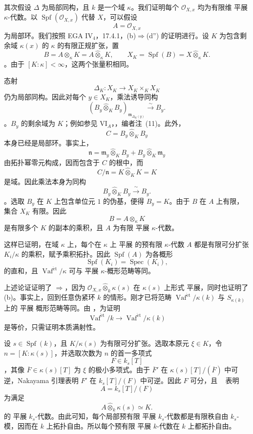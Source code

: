 其次假设 \(\Delta\) 为局部同构，且 \(k\) 是一个域 \(\kappa\)。我们证明每个 \(\mathcal O_{X,x}\) 均为有限维 平展 \(\kappa\)-代数。以 \(\operatorname{Spf}(\mathcal O_{X,x})\) 代替 \(X\)，可以假设 \[
  A=\mathcal O_{X,x}
\] 为局部环。我们按照 EGA \(\mathrm{IV}_4\)，17.4.1，\textup{(b)}\(\Rightarrow\)\textup{(d'')} 的证明进行。设 \(K\) 为包含剩余域 \(\kappa(x)\) 的 \(\kappa\) 的有限正规扩张，置 \[
  B=A\otimes_\kappa K
   =A\widehat\otimes_\kappa K,
  \qquad
  X_K=\operatorname{Spf}(B)
      =X\widehat\otimes_\kappa K.
\]。由于 \([K:\kappa]<\infty\)，这两个张量积相同。

态射 \[
  \Delta_K:
  X_K\longrightarrow X_K\times_KX_K
\] 仍为局部同构。因此对每个 \(y\in X_K\)，乘法诱导同构 \[
  \left(
    B_y\widehat\otimes_KB_y
  \right)_{\mathfrak m_{\Delta_K(y)}}
  \xrightarrow{\ \sim\ }
  B_y.
\]。\(B_y\) 的剩余域为 \(K\)；例如参见 \(\mathrm{VI}_A\)，，编者注~(11)。此外，\[
  C=B_y\widehat\otimes_KB_y
\] 本身已经是局部环。事实上，\[
  \mathfrak n
  =
  \mathfrak m_y\widehat\otimes_KB_y
  +
  B_y\widehat\otimes_K\mathfrak m_y
\] 由拓扑幂零元构成，因而包含于 \(C\) 的根中，而 \[
  C/\mathfrak n
  =
  K\widehat\otimes_KK
  =
  K
\] 是域。因此乘法本身为同构 \[
  B_y\widehat\otimes_KB_y
  \xrightarrow{\ \sim\ }
  B_y.
\]。选取 \(B_y\) 在 \(K\) 上包含单位元 \(1\) 的伪基，便得 \(B_y=K\)。由于 \(B\) 在 \(A\) 上有限，集合 \(X_K\) 有限。因此 \[
  B=A\otimes_\kappa K
\] 是有限多个 \(K\) 的副本的乘积，且 \(A\) 为有限 平展 \(\kappa\)-代数。

这样已证明，在域 \(\kappa\) 上，每个在 \(\kappa\) 上 平展 的预有限 \(\kappa\)-代数 \(A\) 都是有限可分扩张 \(K_i/\kappa\) 的乘积，赋予乘积拓扑。因此 \(\operatorname{Spf}(A)\) 为各概形 \[
  \operatorname{Spf}(K_i)=\operatorname{Spec}(K_i),
\] 的直和，且 \(\operatorname{Vaf}^{\mathrm{\acute{e}t}}/\kappa\) 可与 平展 \(\kappa\)-概形范畴等同。

上述论证证明了 \textup{}\(\Rightarrow\)\textup{}，因为 \(\mathcal O_{X,x}\widehat\otimes_k\kappa(s)\) 在 \(\kappa(s)\) 上形式 平展，同时也证明了 \textup{(b)}。事实上，回到任意伪紧环 \(k\) 的情形。刚才已将范畴 \(\operatorname{Vaf}^{\mathrm{\acute{e}t}}/\kappa(k)\) 与 \(S_{\kappa(k)}\) 上的 平展 概形范畴等同。由 ，为证明 \[
  \operatorname{Vaf}^{\mathrm{\acute{e}t}}/k
  \longrightarrow
  \operatorname{Vaf}^{\mathrm{\acute{e}t}}/\kappa(k)
\] 是等价，只需证明本质满射性。

设 \(s\in\operatorname{Spf}(k)\)，且 \(K/\kappa(s)\) 为有限可分扩张。选取本原元 \(\xi\in K\)，令 \(n=[K:\kappa(s)]\)，并选取次数为 \(n\) 的首一多项式 \[
  F\in k_s[T]
\]，其像 \(\overline F\in\kappa(s)[T]\) 为 \(\xi\) 的极小多项式。由于 \(\overline F'\) 在 \(\kappa(s)[T]/(\overline F)\) 中可逆，Nakayama 引理表明 \(F'\) 在 \(k_s[T]/(F)\) 中可逆。因此 \(F\) 可分，且 ~ 表明 \[
  A=k_s[T]/(F)
\] 为满足 \[
  A\widehat\otimes_k\kappa(s)\simeq K.
\] 的 平展 \(k_s\)-代数。由此可知，每个局部预有限 平展 \(k_s\)-代数都是有限秩自由 \(k_s\)-模，因而在 \(k\) 上拓扑自由。所以每个预有限 平展 \(k\)-代数在 \(k\) 上都拓扑自由。

